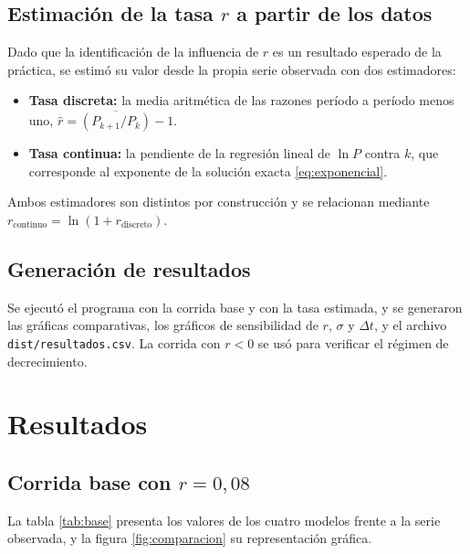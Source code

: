 \documentclass[11pt,a4paper]{article}
\begin{document}
\subsection{Estimaci\'on de la tasa $r$ a partir de los datos}

Dado que la identificaci\'on de la influencia de $r$ es un resultado esperado de la
pr\'actica, se estim\'o su valor desde la propia serie observada con dos estimadores:

\begin{itemize}[leftmargin=*]
  \item \textbf{Tasa discreta:} la media aritm\'etica de las razones
        per\'iodo a per\'iodo menos uno,
        $\hat{r} = \overline{\left(P_{k+1}/P_{k}\right)} - 1$.
  \item \textbf{Tasa continua:} la pendiente de la regresi\'on lineal de $\ln P$ contra
        $k$, que corresponde al exponente de la soluci\'on exacta
        \eqref{eq:exponencial}.
\end{itemize}

Ambos estimadores son distintos por construcci\'on y se relacionan mediante
$r_{\text{continuo}} = \ln\!\left(1 + r_{\text{discreto}}\right)$.

\subsection{Generaci\'on de resultados}

Se ejecut\'o el programa con la corrida base y con la tasa estimada, y se generaron las
gr\'aficas comparativas, los gr\'aficos de sensibilidad de $r$, $\sigma$ y $\Delta t$, y el
archivo \texttt{dist/\allowbreak resultados.csv}. La corrida con $r<0$ se us\'o para verificar el
r\'egimen de decrecimiento.

\section{Resultados}

\subsection{Corrida base con $r = 0{,}08$}

La tabla \ref{tab:base} presenta los valores de los cuatro modelos frente a la serie
observada, y la figura \ref{fig:comparacion} su representaci\'on gr\'afica.
\end{document}

